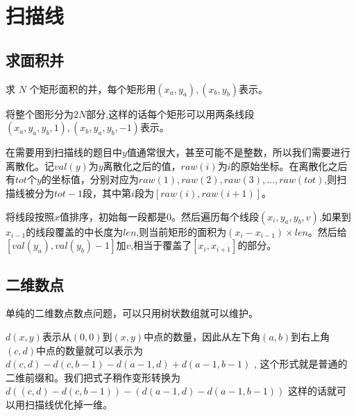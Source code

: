 \section{扫描线}

\subsection{求面积并}
求 $N$ 个矩形面积的并，每个矩形用$(x_a, y_a),(x_b, y_b)$表示。

将整个图形分为$2N$部分,这样的话每个矩形可以用两条线段$(x_a,y_a,y_b,1),(x_b,y_a,y_b,-1)$表示。

在需要用到扫描线的题目中$y$值通常很大，甚至可能不是整数，所以我们需要进行离散化。记$val(y)$为$y$离散化之后的值，$raw(i)$为$i$的原始坐标。在离散化之后有$tot$个$y$的坐标值，分别对应为$raw(1),raw(2),raw(3),\dots,raw(tot)$,则扫描线被分为$tot-1$段，其中第$i$段为$[raw(i),raw(i+1)]$。

将线段按照$x$值排序，初始每一段都是$0$。然后遍历每个线段$(x_i,y_a,y_b,v)$,如果到$x_{i-1}$的线段覆盖的中长度为$len$,则当前矩形的面积为$(x_i - x_{i-1})\times len$。然后给$[val(y_a),val(y_b)-1]$加$v$,相当于覆盖了$[x_i,x_{i+1}]$的部分。



\subsection{二维数点}

单纯的二维数点数点问题，可以只用树状数组就可以维护。

$d(x,y)$表示从$(0,0)$到$(x,y)$中点的数量，因此从左下角$(a,b)$到右上角$(c,d)$中点的数量就可以表示为$d(c,d) - d(c,b-1) - d(a-1,d) + d( a-1,b-1)$ , 这个形式就是普通的二维前缀和。我们把式子稍作变形转换为$d((c,d) - d(c,b-1)) - (d(a-1,d) - d(a-1,b-1))$ 这样的话就可以用扫描线优化掉一维。


